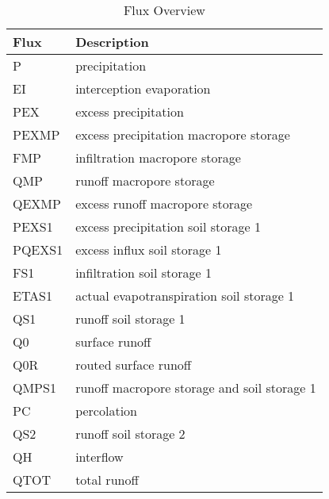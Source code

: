 \documentclass[11pt,color]{tudbook}
\begin{document}
\begin{onehalfspacing}
\begin{table}[H]
\caption{Flux Overview}
\label{tab:Fluxes_Storage_Cascade_model_47}
\begin{center}
\begin{tabular}{|L{1.5cm}|L{9cm}|}
\hline
Flux   & Description                                  \\ \hline
P      & precipitation                                \\ \hline
EI     & interception evaporation                     \\ \hline
PEX    & excess precipitation                         \\ \hline
PEXMP  & excess precipitation macropore storage       \\ \hline
FMP    & infiltration macropore storage               \\ \hline
QMP    & runoff macropore storage                     \\ \hline
QEXMP  & excess runoff macropore storage              \\ \hline
PEXS1  & excess precipitation soil storage 1          \\ \hline
PQEXS1 & excess influx soil storage 1                 \\ \hline
FS1    & infiltration soil storage 1                  \\ \hline
ETAS1  & actual evapotranspiration soil storage 1     \\ \hline
QS1    & runoff soil storage 1                        \\ \hline
Q0     & surface runoff                               \\ \hline
Q0R    & routed surface runoff                        \\ \hline
QMPS1  & runoff macropore storage and soil storage 1  \\ \hline
PC     & percolation                                  \\ \hline
QS2    & runoff soil storage 2                        \\ \hline
QH     & interflow                                    \\ \hline
QTOT   & total runoff                                 \\ \hline
\end{tabular}
\end{center}
\end{table}


\end{onehalfspacing}
\end{document}
